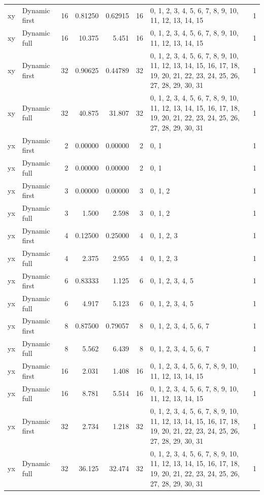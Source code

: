 \documentclass[10pt,a4paper]{article}
\begin{document}
\begin{longtable}{@{}p{23mm}p{29mm}rrrrp{36mm}r@{}}
xy & Dynamic first & 16 & 0.81250 & 0.62915 & 16 & 0, 1, 2, 3, 4, 5, 6, 7, 8, 9, 10, 11, 12, 13, 14, 15 & 1 \\
xy & Dynamic full & 16 & 10.375 & 5.451 & 16 & 0, 1, 2, 3, 4, 5, 6, 7, 8, 9, 10, 11, 12, 13, 14, 15 & 1 \\
xy & Dynamic first & 32 & 0.90625 & 0.44789 & 32 & 0, 1, 2, 3, 4, 5, 6, 7, 8, 9, 10, 11, 12, 13, 14, 15, 16, 17, 18, 19, 20, 21, 22, 23, 24, 25, 26, 27, 28, 29, 30, 31 & 1 \\
xy & Dynamic full & 32 & 40.875 & 31.807 & 32 & 0, 1, 2, 3, 4, 5, 6, 7, 8, 9, 10, 11, 12, 13, 14, 15, 16, 17, 18, 19, 20, 21, 22, 23, 24, 25, 26, 27, 28, 29, 30, 31 & 1 \\
yx & Dynamic first & 2 & 0.00000 & 0.00000 & 2 & 0, 1 & 1 \\
yx & Dynamic full & 2 & 0.00000 & 0.00000 & 2 & 0, 1 & 1 \\
yx & Dynamic first & 3 & 0.00000 & 0.00000 & 3 & 0, 1, 2 & 1 \\
yx & Dynamic full & 3 & 1.500 & 2.598 & 3 & 0, 1, 2 & 1 \\
yx & Dynamic first & 4 & 0.12500 & 0.25000 & 4 & 0, 1, 2, 3 & 1 \\
yx & Dynamic full & 4 & 2.375 & 2.955 & 4 & 0, 1, 2, 3 & 1 \\
yx & Dynamic first & 6 & 0.83333 & 1.125 & 6 & 0, 1, 2, 3, 4, 5 & 1 \\
yx & Dynamic full & 6 & 4.917 & 5.123 & 6 & 0, 1, 2, 3, 4, 5 & 1 \\
yx & Dynamic first & 8 & 0.87500 & 0.79057 & 8 & 0, 1, 2, 3, 4, 5, 6, 7 & 1 \\
yx & Dynamic full & 8 & 5.562 & 6.439 & 8 & 0, 1, 2, 3, 4, 5, 6, 7 & 1 \\
yx & Dynamic first & 16 & 2.031 & 1.408 & 16 & 0, 1, 2, 3, 4, 5, 6, 7, 8, 9, 10, 11, 12, 13, 14, 15 & 1 \\
yx & Dynamic full & 16 & 8.781 & 5.514 & 16 & 0, 1, 2, 3, 4, 5, 6, 7, 8, 9, 10, 11, 12, 13, 14, 15 & 1 \\
yx & Dynamic first & 32 & 2.734 & 1.218 & 32 & 0, 1, 2, 3, 4, 5, 6, 7, 8, 9, 10, 11, 12, 13, 14, 15, 16, 17, 18, 19, 20, 21, 22, 23, 24, 25, 26, 27, 28, 29, 30, 31 & 1 \\
yx & Dynamic full & 32 & 36.125 & 32.474 & 32 & 0, 1, 2, 3, 4, 5, 6, 7, 8, 9, 10, 11, 12, 13, 14, 15, 16, 17, 18, 19, 20, 21, 22, 23, 24, 25, 26, 27, 28, 29, 30, 31 & 1 \\
\end{longtable}\normalsize\setlength{\tabcolsep}{6pt}
\clearpage
\end{document}
